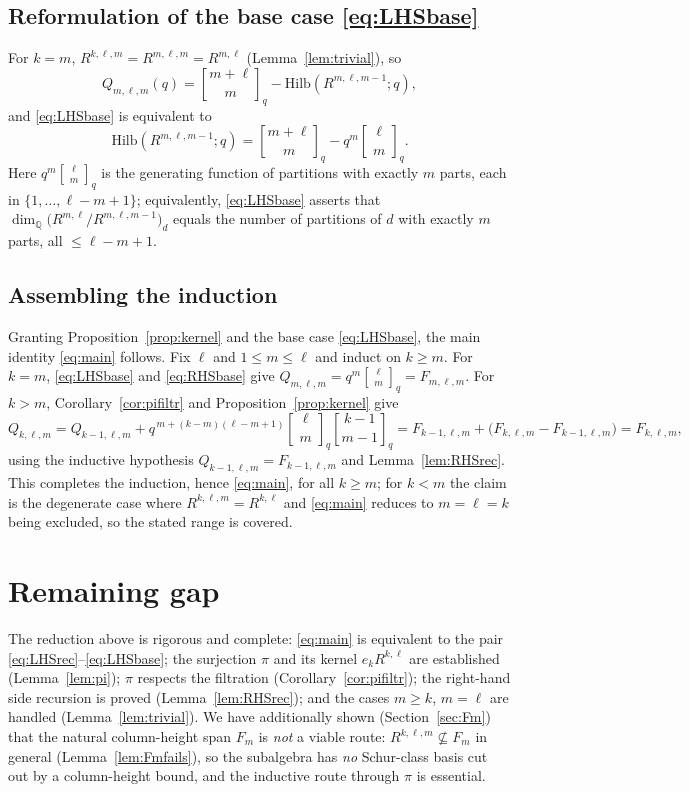 \documentclass{amsart}
\theoremstyle{definition}
\newcommand{\Hilb}{\mathrm{Hilb}}
\newcommand{\qbin}[2]{\genfrac{[}{]}{0pt}{}{#1}{#2}_q}
\newcommand{\Q}{\mathbb{Q}}
\newcommand{\rkl}{R^{k,\ell}}
\newcommand{\Rklm}{R^{k,\ell,m}}
\begin{document}
\subsection*{Reformulation of the base case \eqref{eq:LHSbase}}
For $k=m$, $\Rklm=R^{m,\ell,m}=R^{m,\ell}$ (Lemma~\ref{lem:trivial}), so
\[
Q_{m,\ell,m}(q)=\qbin{m+\ell}{m}-\Hilb(R^{m,\ell,m-1};q),
\]
and \eqref{eq:LHSbase} is equivalent to
\begin{equation}\label{eq:basecum}
\Hilb(R^{m,\ell,m-1};q)=\qbin{m+\ell}{m}-q^{m}\qbin{\ell}{m}.
\end{equation}
Here $q^{m}\qbin{\ell}{m}$ is the generating function of partitions with exactly $m$
parts, each in $\{1,\dots,\ell-m+1\}$; equivalently, \eqref{eq:LHSbase} asserts that
$\dim_\Q\big(R^{m,\ell}/R^{m,\ell,m-1}\big)_d$ equals the number of partitions of $d$
with exactly $m$ parts, all $\le\ell-m+1$.

\subsection*{Assembling the induction}
Granting Proposition~\ref{prop:kernel} and the base case \eqref{eq:LHSbase}, the main
identity \eqref{eq:main} follows. Fix $\ell$ and $1\le m\le\ell$ and induct on
$k\ge m$. For $k=m$, \eqref{eq:LHSbase} and \eqref{eq:RHSbase} give
$Q_{m,\ell,m}=q^m\qbin{\ell}{m}=F_{m,\ell,m}$. For $k>m$,
Corollary~\ref{cor:pifiltr} and Proposition~\ref{prop:kernel} give
\[
Q_{k,\ell,m}=Q_{k-1,\ell,m}+q^{\,m+(k-m)(\ell-m+1)}\qbin{\ell}{m}\qbin{k-1}{m-1}
=F_{k-1,\ell,m}+\big(F_{k,\ell,m}-F_{k-1,\ell,m}\big)=F_{k,\ell,m},
\]
using the inductive hypothesis $Q_{k-1,\ell,m}=F_{k-1,\ell,m}$ and
Lemma~\ref{lem:RHSrec}. This completes the induction, hence \eqref{eq:main}, for all
$k\ge m$; for $k<m$ the claim is the degenerate case where $\Rklm=\rkl$ and
\eqref{eq:main} reduces to $m=\ell=k$ being excluded, so the stated range is covered.

\section*{Remaining gap}

The reduction above is rigorous and complete: \eqref{eq:main} is equivalent to the
pair \eqref{eq:LHSrec}--\eqref{eq:LHSbase}; the surjection $\pi$ and its kernel
$e_k\rkl$ are established (Lemma~\ref{lem:pi}); $\pi$ respects the filtration
(Corollary~\ref{cor:pifiltr}); the right-hand side recursion is proved
(Lemma~\ref{lem:RHSrec}); and the cases $m\ge k$, $m=\ell$ are handled
(Lemma~\ref{lem:trivial}). We have additionally shown
(Section~\ref{sec:Fm}) that the natural column-height span $F_m$ is \emph{not} a
viable route: $\Rklm\not\subseteq F_m$ in general (Lemma~\ref{lem:Fmfails}), so the
subalgebra has \emph{no} Schur-class basis cut out by a column-height bound, and the
inductive route through $\pi$ is essential.
\end{document}
